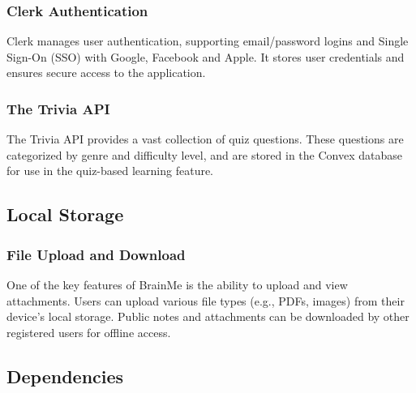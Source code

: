 \subsubsection{Clerk Authentication}

Clerk manages user authentication, supporting email/password logins and Single Sign-On (SSO) with Google, Facebook and Apple. It stores user credentials and ensures secure access to the application.

\subsubsection{The Trivia API}

The Trivia API provides a vast collection of quiz questions. These questions are categorized by genre and difficulty level, and are stored in the Convex database for use in the quiz-based learning feature.

\subsection{Local Storage}

\subsubsection{File Upload and Download}

One of the key features of BrainMe is the ability to upload and view attachments. Users can upload various file types (e.g., PDFs, images) from their device's local storage. Public notes and attachments can be downloaded by other registered users for offline access.

\subsection{Dependencies}

